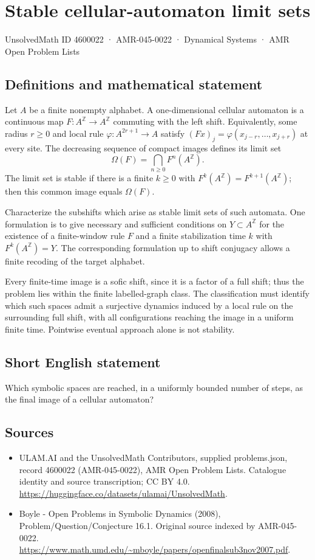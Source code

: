 \documentclass[11pt,a4paper]{article}
\begin{document}
\section*{Stable cellular-automaton limit sets}\label{4600022}
{\small UnsolvedMath ID 4600022 · AMR-045-0022 · Dynamical Systems · AMR Open Problem Lists}
\subsection{Definitions and mathematical statement}
Let $A$ be a finite nonempty alphabet. A one-dimensional cellular
automaton is a continuous map $F:A^{\mathbb Z}\to A^{\mathbb Z}$
commuting with the left shift. Equivalently, some radius $r\ge0$ and
local rule $\varphi:A^{2r+1}\to A$ satisfy
$(Fx)_j=\varphi(x_{j-r},\ldots,x_{j+r})$ at every site.
The decreasing sequence of compact images defines its limit set
\[
       \Omega(F)=\bigcap_{n\ge0}F^n(A^{\mathbb Z}).
\]
The limit set is stable if there is a finite $k\ge0$ with
$F^k(A^{\mathbb Z})=F^{k+1}(A^{\mathbb Z})$; then this common image
equals $\Omega(F)$.

Characterize the subshifts which arise as stable limit sets of such
automata. One formulation is to give necessary and sufficient conditions
on $Y\subset A^{\mathbb Z}$ for the existence of a finite-window rule
$F$ and a finite stabilization time $k$ with $F^k(A^{\mathbb Z})=Y$.
The corresponding formulation up to shift conjugacy allows a finite
recoding of the target alphabet.

Every finite-time image is a sofic shift, since it is a factor of a
full shift; thus the problem lies within the finite labelled-graph
class. The classification must identify which such spaces admit a
surjective dynamics induced by a local rule on the surrounding full
shift, with all configurations reaching the image in a uniform finite
time. Pointwise eventual approach alone is not stability.
\subsection{Short English statement}
Which symbolic spaces are reached, in a uniformly bounded number of steps, as the final image of a cellular automaton?
\subsection{Sources}
\begin{itemize}
\item[S1] ULAM.AI and the UnsolvedMath Contributors, supplied problems.json, record 4600022 (AMR-045-0022), AMR Open Problem Lists. Catalogue identity and source transcription; CC BY 4.0.
\url{https://huggingface.co/datasets/ulamai/UnsolvedMath}.
\item[S2] Boyle - Open Problems in Symbolic Dynamics (2008), Problem/Question/Conjecture 16.1. Original source indexed by AMR-045-0022.
\url{https://www.math.umd.edu/~mboyle/papers/openfinalsub3nov2007.pdf}.
\end{itemize}
\end{document}
